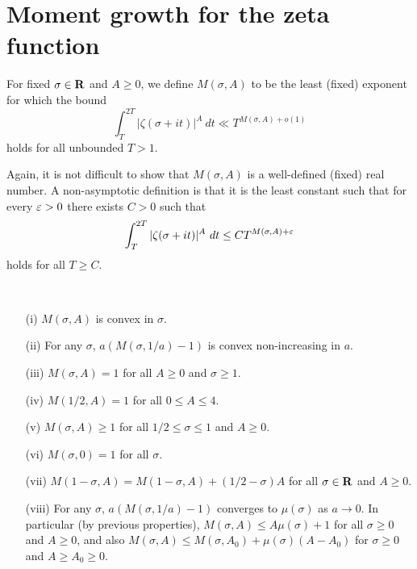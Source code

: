 \chapter{Moment growth for the zeta function}

\begin{definition}\label{zeta-moment-def}  For fixed $\sigma \in \mathbf{R}$ and $A \geq 0$, we define $M(\sigma,A)$ to be the least (fixed) exponent for which the bound
$$ \int_T^{2T} |\zeta(\sigma+it)|^A\ dt \ll T^{M(\sigma,A)+o(1)}$$
holds for all unbounded $T > 1$.
\end{definition}

Again, it is not difficult to show that $M(\sigma,A)$ is a well-defined (fixed) real number.  A non-asymptotic definition is that it is the least constant such that for every $\varepsilon>0$ there exists $C>0$ such that
$$ \int_T^{2T} |\zeta(\sigma+it)|^A\ dt \leq C T^{M(\sigma,A)+\eps}$$
holds for all $T \geq C$.

\begin{lemma}\label{zeta-moment-basic}\
\begin{itemize}
\item[(i)] $M(\sigma,A)$ is convex in $\sigma$.
\item[(ii)] For any $\sigma$, $a (M(\sigma,1/a)-1)$ is convex non-increasing in $a$.
\item[(iii)] $M(\sigma,A)=1$ for all $A \geq 0$ and $\sigma \geq 1$.
\item[(iv)] $M(1/2,A)=1$ for all $0 \leq A \leq 4$.
\item[(v)] $M(\sigma,A) \geq 1$ for all $1/2 \leq \sigma \leq 1$ and $A \geq 0$.
\item[(vi)] $M(\sigma,0) = 1$ for all $\sigma$.
\item[(vii)] $M(1-\sigma,A) = M(1-\sigma,A) + (1/2-\sigma) A$ for all $\sigma \in \mathbf{R}$ and $A \geq 0$.
\item[(viii)] For any $\sigma$, $a(M(\sigma,1/a)-1)$ converges to $\mu(\sigma)$ as $a \to 0$.  In particular (by previous properties), $M(\sigma,A) \leq A \mu(\sigma) + 1$ for all $\sigma \geq 0$ and $A \geq 0$, and also $M(\sigma,A) \leq M(\sigma,A_0) + \mu(\sigma)(A-A_0)$ for $\sigma \geq 0$ and $A \geq A_0 \geq 0$.
\end{itemize}
\end{lemma}

